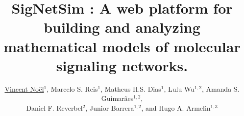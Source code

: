 
 
\title{\LARGE%
SigNetSim : A web platform for building and analyzing mathematical models of molecular signaling networks.%
}

\author{\vspace*{1.5cm}\underline{Vincent No\"el$^{1}$}, Marcelo S. Reis$^{1}$, Matheus H.S. Dias$^{1}$, Lulu Wu$^{1,2}$, Amanda S. Guimarães$^{1,2}$,\\ Daniel F. Reverbel$^{2}$, Junior Barrera$^{1,2}$, and Hugo A. Armelin$^{1,3}$}




